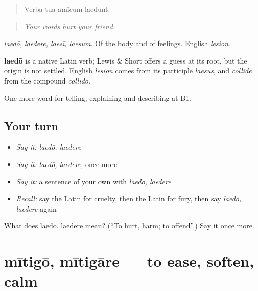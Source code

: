 \begin{quote}
Verba tua amīcum laedunt.
\end{quote}

\begin{quote}
\emph{Your words hurt your friend.}
\end{quote}

\emph{laedō, laedere, laesī, laesum}. Of the body and of feelings. English \emph{lesion}.

\begin{cousinweb}
\textbf{laedō} is a native Latin verb; Lewis \& Short offers a guess at its root, but the origin is not settled. English \emph{lesion} comes from its participle \emph{laesus}, and \emph{collide} from the compound \emph{collīdō}.
\end{cousinweb}

\begin{grammarlens}[title={What you've built}]
One more word for telling, explaining and describing at B1.
\end{grammarlens}

\subsection*{Your turn}
\begin{itemize}
\raggedright
  \item \emph{Say it:} \emph{laedō, laedere}
  \item \emph{Say it:} \emph{laedō, laedere}, once more
  \item \emph{Say it:} a sentence of your own with \emph{laedō, laedere}
  \item \emph{Recall:} say the Latin for cruelty, then the Latin for fury, then say \emph{laedō, laedere} again
\end{itemize}

\begin{tcolorbox}[breakable,colback=teal!4,colframe=teal!35!black,title={Before you move on}]
What does laedō, laedere mean? (\textquotedblleft{}To hurt, harm; to offend\textquotedblright{}.) Say it once more.
\end{tcolorbox}
\section[mītigō, mītigāre]{mītigō, mītigāre — to ease, soften, calm}

\label{lesson:LA-C511-mitigo}



